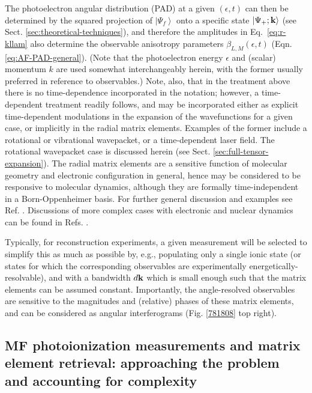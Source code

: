 \documentclass[10pt]{article}
\begin{document}
The photoelectron angular distribution (PAD) at a given $(\epsilon,t)$ can then be determined by the squared projection of $\left|\Psi_f\right>$ onto a specific state $\left|\Psi_{+};\bf{k}\right>$ (see Sect. \ref{sec:theoretical-techniques}), and therefore the amplitudes in Eq.~\ref{eq:r-kllam} also determine the observable anisotropy parameters $\beta_{L,M}(\epsilon,t)$ (Eqn. \ref{eq:AF-PAD-general}). (Note that the photoelectron energy $\epsilon$ and (scalar) momentum $k$ are used somewhat interchangeably herein, with the former usually preferred in reference to observables.) Note, also, that in the treatment above there is no time-dependence incorporated in the notation; however, a time-dependent treatment readily follows, and may be incorporated either as explicit time-dependent modulations in the expansion of the wavefunctions for a given case, or implicitly in the radial matrix elements. Examples of the former include a rotational or vibrational wavepacket, or a time-dependent laser field. The rotational wavepacket case is discussed herein (see Sect. \ref{sec:full-tensor-expansion}). The radial matrix elements are a sensitive function of molecular geometry and electronic configuration in general, hence may be considered to be responsive to molecular dynamics, although they are formally time-independent in a Born-Oppenheimer basis. For further general discussion and examples see Ref. \cite{wu2011TimeresolvedPhotoelectronSpectroscopy}. Discussions of more complex cases with electronic and nuclear dynamics can be found in Refs.  \cite{arasaki2000ProbingWavepacketDynamics,Seideman2001, Suzuki2001,Stolow2008}.

Typically, for reconstruction experiments, a given measurement will be selected to simplify this as much as possible by, e.g., populating only a single ionic state (or states for which the corresponding observables are experimentally energetically-resolvable), and with a bandwidth $d\bf{k}$ which is small enough such that the matrix elements can be assumed constant. Importantly, the angle-resolved observables are sensitive to the magnitudes and (relative) phases of these matrix elements, and can be considered as angular interferograms (Fig. \ref{781808} top right).


\subsection{MF photoionization measurements and matrix element retrieval: approaching the problem and accounting for complexity\label{sec:MF-recon-basic-intro}}
\end{document}
